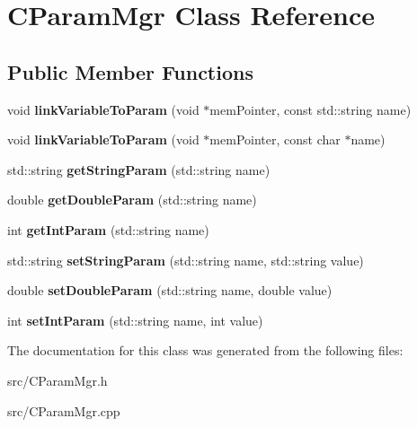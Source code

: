 \hypertarget{class_c_param_mgr}{
\section{CParamMgr Class Reference}
\label{class_c_param_mgr}
}
\subsection*{Public Member Functions}
\begin{DoxyCompactItemize}
\item 
\hypertarget{class_c_param_mgr_a9782c5702391637f863ec6b5f3ded8cd}{
void {\bfseries linkVariableToParam} (void $\ast$memPointer, const std::string name)}
\label{class_c_param_mgr_a9782c5702391637f863ec6b5f3ded8cd}

\item 
\hypertarget{class_c_param_mgr_a54f329c9984f9bd815727e31a0ac09a9}{
void {\bfseries linkVariableToParam} (void $\ast$memPointer, const char $\ast$name)}
\label{class_c_param_mgr_a54f329c9984f9bd815727e31a0ac09a9}

\item 
\hypertarget{class_c_param_mgr_aad11c811d7df59fee55348863c5eb83f}{
std::string {\bfseries getStringParam} (std::string name)}
\label{class_c_param_mgr_aad11c811d7df59fee55348863c5eb83f}

\item 
\hypertarget{class_c_param_mgr_a2ffd91cd1e15d12386f61857611f0073}{
double {\bfseries getDoubleParam} (std::string name)}
\label{class_c_param_mgr_a2ffd91cd1e15d12386f61857611f0073}

\item 
\hypertarget{class_c_param_mgr_a3fa3412a604ac072f4055a5d3a560975}{
int {\bfseries getIntParam} (std::string name)}
\label{class_c_param_mgr_a3fa3412a604ac072f4055a5d3a560975}

\item 
\hypertarget{class_c_param_mgr_aa92e47cccb3007844d60b51b904c7f36}{
std::string {\bfseries setStringParam} (std::string name, std::string value)}
\label{class_c_param_mgr_aa92e47cccb3007844d60b51b904c7f36}

\item 
\hypertarget{class_c_param_mgr_abc525dbc23dcbc7471165f682fd8d434}{
double {\bfseries setDoubleParam} (std::string name, double value)}
\label{class_c_param_mgr_abc525dbc23dcbc7471165f682fd8d434}

\item 
\hypertarget{class_c_param_mgr_a66b81d0f97c7a413086361409c456926}{
int {\bfseries setIntParam} (std::string name, int value)}
\label{class_c_param_mgr_a66b81d0f97c7a413086361409c456926}

\end{DoxyCompactItemize}


The documentation for this class was generated from the following files:\begin{DoxyCompactItemize}
\item 
src/CParamMgr.h\item 
src/CParamMgr.cpp\end{DoxyCompactItemize}
